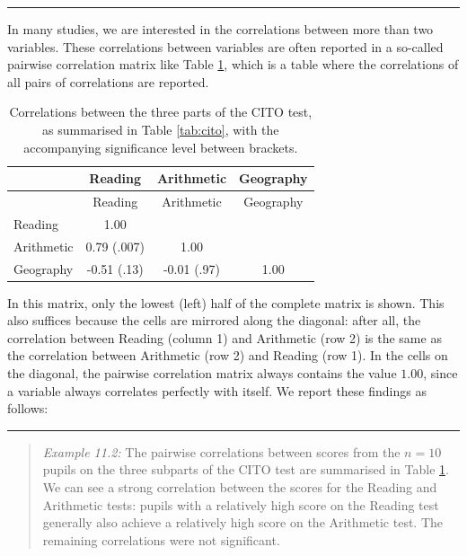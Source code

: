 \documentclass[
]{book}
\begin{document}
\begin{center}\rule{0.5\linewidth}{0.5pt}\end{center}

In many studies, we are interested in the correlations between more
than two variables. These correlations between variables are often
reported in a so-called pairwise
correlation matrix like
Table \ref{tab:cito-correlations}, which is a table where the correlations
of all pairs of correlations are reported.

\begin{longtable}[]{@{}lccc@{}}
\caption{\label{tab:cito-correlations} Correlations between the three parts of the CITO
test, as summarised in Table \ref{tab:cito}, with the accompanying significance level between brackets.}\tabularnewline
\toprule\noalign{}
& Reading & Arithmetic & Geography \\
\midrule\noalign{}
\endfirsthead
\toprule\noalign{}
& Reading & Arithmetic & Geography \\
\midrule\noalign{}
\endhead
\bottomrule\noalign{}
\endlastfoot
Reading & 1.00 & & \\
Arithmetic & 0.79 (.007) & 1.00 & \\
Geography & -0.51 (.13) & -0.01 (.97) & 1.00 \\
\end{longtable}

In this matrix, only the lowest (left) half of the complete
matrix is shown. This also suffices because the cells are mirrored
along the diagonal: after all, the correlation between Reading (column 1) and Arithmetic
(row 2) is the same as the correlation between Arithmetic (row 2) and
Reading (row 1). In the cells on the diagonal, the pairwise correlation matrix
always contains the value \(1.00\), since a variable always correlates perfectly with
itself.
We report these findings as follows:

\begin{center}\rule{0.5\linewidth}{0.5pt}\end{center}

\begin{quote}
\emph{Example 11.2:} The
pairwise correlations between scores from the \(n=10\) pupils on the
three subparts of the CITO test are summarised in
Table \ref{tab:cito-correlations}. We can see a strong correlation between
the scores for the Reading and Arithmetic tests: pupils with a relatively
high score on the Reading test generally also achieve a relatively high
score on the Arithmetic test. The remaining correlations were
not significant.
\end{quote}
\end{document}
